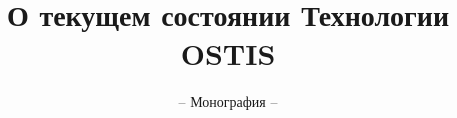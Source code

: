 \documentclass[graybox,envcountchap,sectrefs]{svmono}
\begin{document}
\author{}
\title{О текущем состоянии Технологии OSTIS}
\subtitle{-- Монография --}
\maketitle

\frontmatter%



\tableofcontents



\mainmatter%









\backmatter%

\printindex

\end{document}
